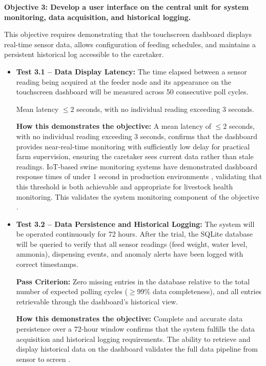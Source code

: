 \textbf{Objective 3: Develop a user interface on the central unit for system monitoring, data acquisition, and historical logging.}

This objective requires demonstrating that the touchscreen dashboard displays real-time sensor data, allows configuration of feeding schedules, and maintains a persistent historical log accessible to the caretaker.

\begin{itemize}
  \item \textbf{Test 3.1 -- Data Display Latency:} The time elapsed between a sensor reading being acquired at the feeder node and its appearance on the touchscreen dashboard will be measured across 50 consecutive poll cycles.

    Mean latency $\le 2$ seconds, with no individual reading exceeding 3 seconds.

    \textbf{How this demonstrates the objective:} A mean latency of $\le 2$ seconds, with no individual reading exceeding 3 seconds, confirms that the dashboard provides near-real-time monitoring with sufficiently low delay for practical farm supervision, ensuring the caretaker sees current data rather than stale readings. IoT-based swine monitoring systems have demonstrated dashboard response times of under 1 second in production environments \cite{he2024iot}, validating that this threshold is both achievable and appropriate for livestock health monitoring. This validates the system monitoring component of the objective \cite{beyondtech2025smart,adeoye2025animalia}.


  \item \textbf{Test 3.2 -- Data Persistence and Historical Logging:} The system will be operated continuously for 72 hours. After the trial, the SQLite database will be queried to verify that all sensor readings (feed weight, water level, ammonia), dispensing events, and anomaly alerts have been logged with correct timestamps.

    \textbf{Pass Criterion:} Zero missing entries in the database relative to the total number of expected polling cycles ($\geq 99\%$ data completeness), and all entries retrievable through the dashboard's historical view.

    \textbf{How this demonstrates the objective:} Complete and accurate data persistence over a 72-hour window confirms that the system fulfills the data acquisition and historical logging requirements. The ability to retrieve and display historical data on the dashboard validates the full data pipeline from sensor to screen \cite{beyondtech2025smart,adeoye2025animalia}.


\end{itemize}
